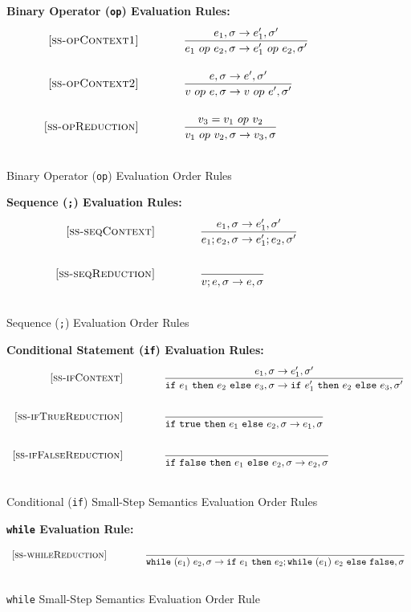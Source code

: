 \documentclass{article}
\newcommand{\ife}[3]{\mbox{\tt if}~{#1}~\mbox{\tt then}~{#2}~\mbox{\tt else}~{#3}}
\newcommand{\whilee}[2]{\mbox{\tt while}~(#1)~#2}
\newcommand{\true}{\mbox{\tt true}}
\newcommand{\false}{\mbox{\tt false}}
\begin{document}
\begin{figure}[H]\label{fig:opRules}
\caption{Binary Operator ({\tt op}) Evaluation Order Rules}
{\bf Binary Operator ({\tt op}) Evaluation Rules:}
\[
\\
\begin{array}{r@{\qquad\qquad}l}
\ssrule{ss-opContext1}{
  \sstep{e_1}{\sigma}{e_1'}{\sigma'}
}{
  \sstep{e_1~op~e_2}{\sigma}{e_1'~op~e_2}{\sigma'}
}
\ssrule{ss-opContext2}{
  \sstep{e}{\sigma}{e'}{\sigma'}
}{
  \sstep{v~op~e}{\sigma}{v~op~e'}{\sigma'}
}
\ssrule{ss-opReduction}{
  v_3 = v_1 ~op~ v_2
}{
  \sstep{v_1~op~v_2}{\sigma}{v_3}{\sigma}
}
\end{array}
\]
\end{figure}

\begin{figure}[H]\label{fig:seqRules}
\caption{Sequence ({\tt ;}) Evaluation Order Rules}
{\bf Sequence ({\tt ;}) Evaluation Rules:}
\[
\\
\begin{array}{r@{\qquad\qquad}l}
\ssrule{ss-seqContext}{
  \sstep{e_1}{\sigma}{e_1'}{\sigma'}
}{
  \sstep{e_1 ; e_2}{\sigma}{e_1' ; e_2}{\sigma'}
}
\ssrule{ss-seqReduction}{
}{
  \sstep{v ; e}{\sigma}{e}{\sigma}
}
\end{array}
\]
\end{figure}

\begin{figure}[H]\label{fig:condRules}
\caption{Conditional ({\tt if}) Small-Step Semantics Evaluation Order Rules}
{\bf Conditional Statement ({\tt if}) Evaluation Rules:}
\[
\\
\begin{array}{r@{\qquad\qquad}l}
\ssrule{ss-ifContext}{
  \sstep{e_1}{\sigma}{e_1'}{\sigma'}
}{
  \sstep{\ife{e_1}{e_2}{e_3}}{\sigma}{\ife{e_1'}{e_2}{e_3}}{\sigma'}
}
\ssrule{ss-ifTrueReduction}{
}{
  \sstep{\ife{\true}{e_1}{e_2}}{\sigma}{e_1}{\sigma}
}
\ssrule{ss-ifFalseReduction}{
}{
  \sstep{\ife{\false}{e_1}{e_2}}{\sigma}{e_2}{\sigma}
}
\end{array}
\]
\end{figure}

\begin{figure}[H]\label{fig:whileRules}
\caption{{\tt while} Small-Step Semantics Evaluation Order Rule}
{\bf {\tt while} Evaluation Rule:} 
\[
\\
\begin{array}{r@{\qquad\qquad}l}
\ssrule{ss-whileReduction}{
}{
  \sstep{\whilee{e_1}{e_2}}{\sigma}{\ife{e_1}{e_2;\whilee{e_1}{e_2}}{\false}}{\sigma}
}
\end{array}
\]
\end{figure}
\end{document}
